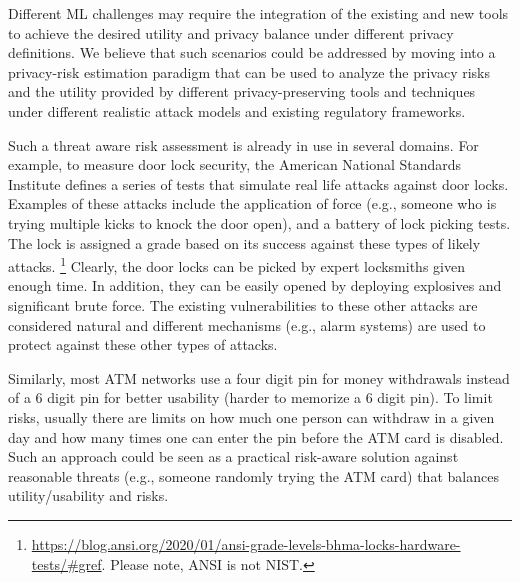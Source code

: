 \documentclass{article}
\begin{document}
Different ML challenges may require the integration of the existing and new tools to achieve the desired utility and privacy balance under different privacy definitions. We believe that such scenarios could be addressed by moving into a privacy-risk estimation paradigm that can be used to analyze the privacy risks and the utility provided by different privacy-preserving tools and techniques under different realistic attack models and existing regulatory frameworks. 

Such a threat aware risk assessment is already in use in several domains. For example, to measure door lock security, the American National Standards Institute defines a series of tests that simulate real life attacks against door locks. Examples of these attacks include the application of force (e.g., someone who is trying multiple kicks to %
knock the door open),  
and a battery of lock picking tests. The lock is assigned a grade based on its success against these types of likely attacks. \footnote{\url{https://blog.ansi.org/2020/01/ansi-grade-levels-bhma-locks-hardware-tests/\#gref}. Please note, ANSI is not NIST.} Clearly, the door locks can be picked by expert locksmiths given enough time. In addition, they can be easily opened by deploying explosives and significant brute force. The existing vulnerabilities to these other attacks are considered natural and different mechanisms (e.g., alarm systems) are used to protect against these other types of attacks. 

Similarly, most ATM networks use a four digit pin for money withdrawals instead of a 6 digit pin for better usability %
(harder to memorize a 6 digit pin). To limit risks, usually there are limits on how much one person can withdraw in a given day and how many times one can enter the pin before the ATM card is disabled.  Such an approach could be seen as a practical risk-aware solution against reasonable threats (e.g., someone randomly trying the ATM card) that balances utility/usability %
and risks. 
\end{document}
